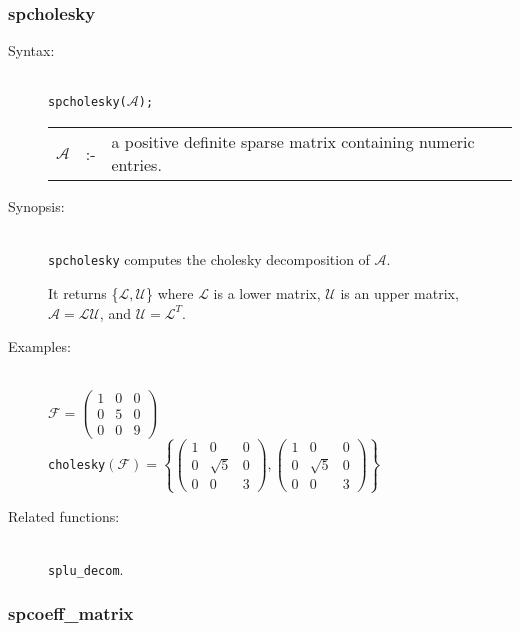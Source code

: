 \subsubsection{spcholesky}
\label{sparse:spcholesky}
\hypertarget{operator:SPCHOLESKY}{}

\begin{description}
\item[Syntax:]\mbox{}\\
\texttt{spcholesky($\mathcal{A}$);}\\[2mm]
\begin{tabular}{l l l}
$\mathcal{A}$ &:-& a positive definite sparse matrix containing numeric entries.
\end{tabular}

\item[Synopsis:]\mbox{}\\
\texttt{spcholesky} computes the cholesky decomposition of $\mathcal{A}$.

It returns \{$\mathcal{L,U}$\} where $\mathcal{L}$
is a lower matrix, $\mathcal{U}$ is an upper matrix, \\ $\mathcal{A} =
\mathcal{LU}$, and $\mathcal{U} = \mathcal{L}^T$.

\item[Examples:]\mbox{}\\
\(\mathcal{F} = \begin{pmatrix} 1 & 0 & 0 \\ 0 & 5 & 0 \\ 0 & 0 & 9 \end{pmatrix}\) \\[2mm]
\texttt{cholesky}\((\mathcal{F})  =
\left\{
   \begin{pmatrix} 1 & 0 & 0 \\ 0 & \sqrt{5} & 0 \\ 0 & 0& 3 \end{pmatrix},
   \begin{pmatrix} 1 & 0 & 0 \\ 0 & \sqrt{5} & 0 \\ 0 & 0 & 3 \end{pmatrix}
\right\}\)

\item[Related functions:]\mbox{}\\
\texttt{splu\_decom}.
\end{description}

\subsubsection{spcoeff\_matrix}
\label{sparse:spcoeff_matrix}
\hypertarget{operator:SPCOEFF_MATRIX}{}


